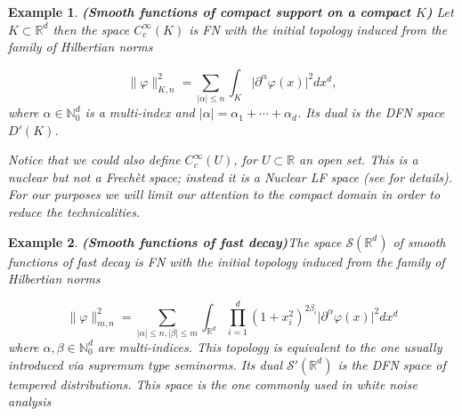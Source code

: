 \documentclass[12pt]{article}%
\newtheorem{example}{Example}%
\begin{document}
\begin{example}\label{ex:testFunctions}{\bf (Smooth functions of compact support on a compact $K$)}
    Let $K\subset \mathbb{R}^d$ then the space $C^{\infty}_c(K)$ is FN with the initial topology induced from the family of Hilbertian norms

\begin{equation}
\label{eq:hilbertianNormsCompactSupport}
\lVert\varphi\rVert_{K,n}^2=\sum_{\lvert\alpha\rvert\leq n}\int_{K}\lvert\partial^\alpha\varphi(x)\rvert^2 dx^d,
\end{equation}
where $\alpha\in \mathbb{N}_0^d$ is a multi-index and $\lvert\alpha\rvert=\alpha_1+\cdots+\alpha_d$.  Its dual is the DFN space $D'(K)$. 

Notice that we could also define $C^\infty_c(U)$, for $U\subset \mathbb{R}$ an open set. This is a nuclear  but not  a Frechèt space; instead it is a Nuclear LF space (see \cite{Gellfand} for details). For our purposes we will limit our attention to the compact domain in order to reduce the technicalities.
\end{example}



\begin{example}{\bf (Smooth functions of fast decay)}\label{ex:schwartFunctions} The space $\mathcal{S}(\mathbb{R}^d)$ of smooth functions of fast decay is FN with the initial topology induced from the family of Hilbertian norms

    \begin{equation}
        \label{eq:hilbertianNormsSchwartz}
        \lVert\varphi\rVert_{m,n}^2=\sum_{\lvert\alpha\rvert\leq n, \lvert\beta\rvert\leq m}\int_{\mathbb{R}^d}\prod_{i=1}^d(1+x_i^2)^{2\beta_i}\lvert \partial^\alpha\varphi(x)\rvert^2 dx^d
    \end{equation}
    where $\alpha,\beta\in \mathbb{N}_0^d$ are multi-indices. This topology is equivalent to the one usually introduced via supremum type seminorms. Its dual $\mathcal{S}'(\mathbb{R}^d)$ is the DFN space of tempered distributions. This space is the one commonly used in white noise analysis \cite{Hida1993}  
\end{example}
\end{document}
